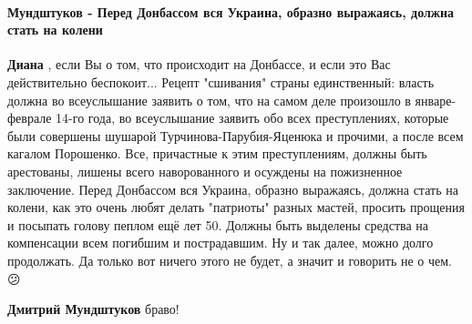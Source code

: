  
 
 
 
 
\paragraph{Мундштуков - Перед Донбассом вся Украина, образно выражаясь, должна стать на колени}

\begin{itemize}
 
\textbf{Диана} , если Вы о том, что происходит на Донбассе, и если это Вас
действительно беспокоит... Рецепт "сшивания" страны единственный: власть должна
во всеуслышание заявить о том, что на самом деле произошло в январе-феврале
14-го года, во всеуслышание заявить обо всех преступлениях, которые были
совершены шушарой Турчинова-Парубия-Яценюка и прочими, а после всем кагалом
Порошенко. Все, причастные к этим преступлениям, должны быть арестованы, лишены
всего наворованного и осуждены на пожизненное заключение. Перед Донбассом вся
Украина, образно выражаясь, должна стать на колени, как это очень любят делать
"патриоты" разных мастей, просить прощения и посыпать голову пеплом ещё лет 50.
Должны быть выделены средства на компенсации всем погибшим и пострадавшим. Ну и
так далее, можно долго продолжать. Да только вот ничего этого не будет, а
значит и говорить не о чем. 😕

\begin{itemize}
 
\textbf{Дмитрий Мундштуков} браво!👏

 

\end{itemize}
\end{itemize}
